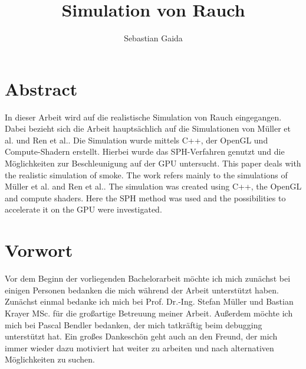 \documentclass[intern,palatino]{cgBA}
\author{Sebastian Gaida}
\title{Simulation von Rauch}
\begin{document}
	\maketitle
	\newpage
	\tableofcontents
	\clearpage
	


\section*{Abstract}\label{abstract}

In dieser Arbeit wird auf die realistische Simulation von Rauch eingegangen. Dabei bezieht sich die Arbeit hauptsächlich auf die Simulationen von Müller et al.\cite{muller2003particle} und Ren et al.\cite{ren2016fast}. Die Simulation wurde mittels C++, der OpenGL und Compute-Shadern erstellt. Hierbei wurde das SPH-Verfahren genutzt und die Möglichkeiten zur Beschleunigung auf der GPU untersucht.
\newline \newline
This paper deals with the realistic simulation of smoke. The work refers mainly to the simulations of Müller et al.\cite{muller2003particle} and Ren et al.\cite{ren2016fast}. The simulation was created using C++, the OpenGL and compute shaders. Here the SPH method was used and the possibilities to accelerate it on the GPU were investigated.
\newpage


\section{Vorwort}\label{vorwort}

Vor dem Beginn der vorliegenden Bachelorarbeit möchte ich mich zunächst bei einigen Personen bedanken die mich während der Arbeit unterstützt haben.
\newline \newline
Zunächst einmal bedanke ich mich bei Prof. Dr.-Ing. Stefan Müller und Bastian Krayer MSc. für die großartige Betreuung meiner Arbeit.
\newline
Außerdem möchte ich mich bei Pascal Bendler bedanken, der mich tatkräftig beim debugging unterstützt hat.
\newline
Ein großes Dankeschön geht auch an den Freund, der mich immer wieder dazu motiviert hat weiter zu arbeiten und nach alternativen Möglichkeiten zu suchen.
\newpage
\end{document}
